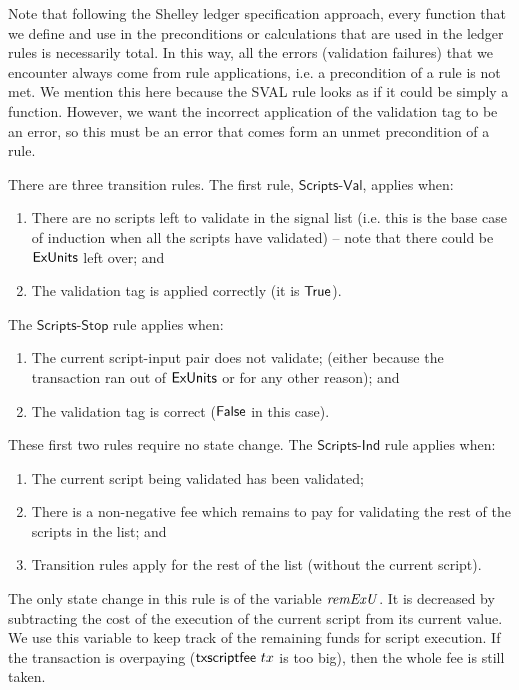 Note that following the Shelley ledger specification approach, every function
that we define and use in the preconditions or calculations that are used in the ledger rules is
necessarily total.
In this way, all the errors (validation failures) that we encounter always come from
rule applications, i.e. a precondition of a rule is not met.
We mention this here because the SVAL rule looks as if it could be
simply a function. However, we want the incorrect application of the
validation tag to be an error, so this must be an error that comes form
an unmet precondition of a rule.

There are three transition rules.
The first rule, $\mathsf{Scripts\mbox{-}Val}$, applies when:

\begin{enumerate}
\item There
are no scripts left to validate in the signal list (i.e. this is the base case of
induction when all the scripts have validated) -- note that there could be $\mathsf{ExUnits}$ left over; and
\item The validation tag is applied correctly (it is $\mathsf{True}$).
\end{enumerate}

The $\mathsf{Scripts\mbox{-}Stop}$ rule applies when:

\begin{enumerate}
  \item The current script-input pair  does not validate;
  (either because the transaction ran out of $\mathsf{ExUnits}$ or for any other reason); and
  \item The validation tag is correct ($\mathsf{False}$ in this case).
\end{enumerate}

These first two rules require no state change.
The $\mathsf{Scripts\mbox{-}Ind}$ rule applies when:

\begin{enumerate}
  \item The current script being validated has been validated;
  \item There is a non-negative fee which remains to pay for validating
  the rest of the scripts in the list; and
  \item Transition rules apply for the rest of the list (without the current script).
\end{enumerate}

The only state change in this rule is of the variable $\mathit{remExU}$.
It is decreased by subtracting the cost of the execution of the
current script from its current value.
We use this variable to keep track of the remaining funds for
script execution. If the transaction is overpaying ($\mathsf{txscriptfee}~{tx}$
is too big), then the whole fee is still taken.

